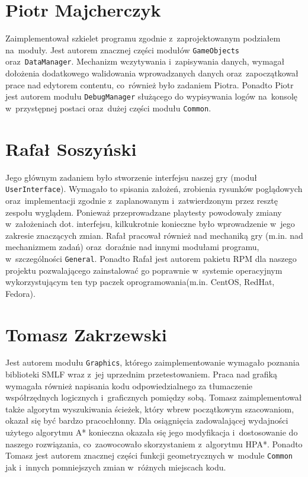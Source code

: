\documentclass[licencjacka]{pracamgr}
\begin{document}
  \section{Piotr Majcherczyk}
    Zaimplementował szkielet programu zgodnie z~zaprojektowanym podziałem na~moduły. Jest autorem znacznej części modułów \texttt{GameObjects}
    oraz~\texttt{DataManager}. Mechanizm wczytywania i~zapisywania danych, wymagał dołożenia dodatkowego walidowania wprowadzanych danych
    oraz~zapoczątkował prace nad edytorem contentu, co~również było zadaniem Piotra. Ponadto Piotr jest autorem modułu \texttt{DebugManager}
    służącego do wypisywania logów na~konsolę w~przystępnej postaci oraz~dużej części modułu \texttt{Common}.

  \section{Rafał Soszyński}
    Jego głównym zadaniem było stworzenie interfejsu naszej gry (moduł \texttt{UserInterface}). Wymagało to spisania założeń, zrobienia 
    rysunków poglądowych oraz~implementacji zgodnie z~zaplanowanym i~zatwierdzonym przez resztę zespołu wyglądem. Ponieważ przeprowadzane
    playtesty powodowały zmiany w~założeniach dot. interfejsu, kilkukrotnie konieczne było wprowadzenie w~jego zakresie znaczących zmian.
    Rafał pracował również nad mechaniką gry (m.in. nad mechanizmem zadań) oraz~doraźnie nad innymi modułami programu, w~szczególności
    \texttt{General}. Ponadto Rafał jest autorem pakietu RPM dla naszego projektu pozwalającego zainstalować go poprawnie w~systemie operacyjnym
    wykorzystującym ten typ paczek oprogramowania(m.in. CentOS, RedHat, Fedora).

  \section{Tomasz Zakrzewski}
    Jest autorem modułu \texttt{Graphics}, którego zaimplementowanie wymagało poznania biblioteki SMLF wraz z~jej uprzednim przetestowaniem.
    Praca nad grafiką wymagała również napisania kodu odpowiedzialnego za tłumaczenie współrzędnych logicznych i~graficznych pomiędzy sobą.
    Tomasz zaimplementował także algorytm wyszukiwania ścieżek, który wbrew początkowym szacowaniom, okazał się być bardzo pracochłonny.
    Dla osiągnięcia zadowalającej wydajności użytego algorytmu A* konieczna okazała się jego modyfikacja i~dostosowanie do naszego rozwiązania,
    co~zaowocowało skorzystaniem z~algorytmu HPA*. Ponadto Tomasz jest autorem znacznej części funkcji geometrycznych w~module \texttt{Common}
    jak i~innych pomniejszych zmian w~różnych miejscach kodu.
\end{document}
